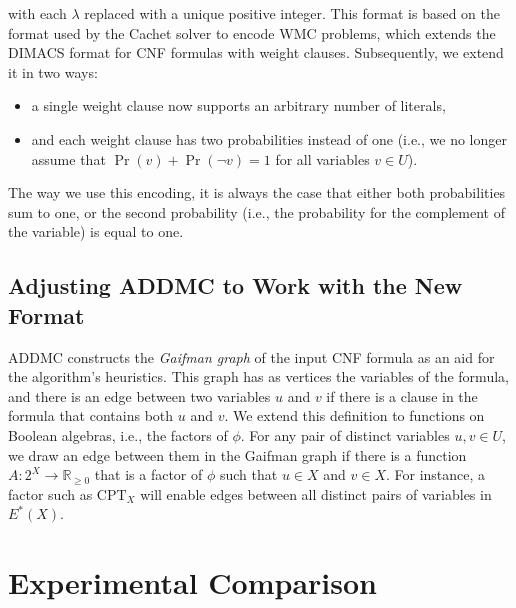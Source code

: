 \documentclass{article}
\theoremstyle{definition}
\theoremstyle{remark}
\begin{document}
with each $\lambda$ replaced with a unique positive integer. This format is
based on the format used by the Cachet solver \cite{DBLP:conf/sat/SangBBKP04}
to encode WMC problems, which extends the DIMACS format for CNF formulas with
weight clauses. Subsequently, we extend it in two ways:
\begin{itemize}
\item a single weight clause now supports an arbitrary number of literals,
\item and each weight clause has two probabilities instead of one (i.e., we no
  longer assume that $\Pr(v) + \Pr(\neg v) = 1$ for all variables $v \in U$).
\end{itemize}
The way we use this encoding, it is always the case that either both
probabilities sum to one, or the second probability (i.e., the probability for
the complement of the variable) is equal to one.

\subsection{Adjusting ADDMC to Work with the New Format}


ADDMC constructs the \emph{Gaifman graph} of the input CNF formula as an aid for
the algorithm's heuristics. This graph has as vertices the variables of the
formula, and there is an edge between two variables $u$ and $v$ if there is a
clause in the formula that contains both $u$ and $v$. We extend this definition
to functions on Boolean algebras, i.e., the factors of $\phi$. For any pair of
distinct variables $u, v \in U$, we draw an edge between them in the Gaifman
graph if there is a function $A\colon 2^X \to \mathbb{R}_{\ge 0}$ that is a
factor of $\phi$ such that $u \in X$ and $v \in X$. For instance, a factor such
as $\mathrm{CPT}_X$ will enable edges between all distinct pairs of variables in
$E^*(X)$.

\section{Experimental Comparison} \label{sec:experiments}
\end{document}
